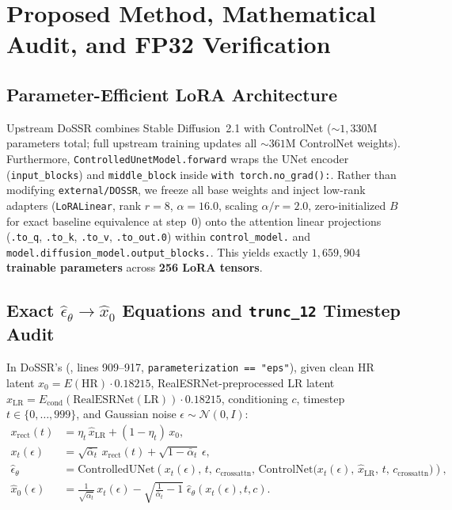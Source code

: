 \documentclass[11pt]{article}
\begin{document}
\section{Proposed Method, Mathematical Audit, and FP32 Verification}
\subsection{Parameter-Efficient LoRA Architecture}
Upstream DoSSR combines Stable Diffusion~2.1 with ControlNet ($\sim 1{,}330\text{M}$ parameters total; full upstream training updates all $\sim 361\text{M}$ ControlNet weights). Furthermore, \texttt{ControlledUnetModel.forward} wraps the UNet encoder (\texttt{input\_blocks}) and \texttt{middle\_block} inside \texttt{with torch.no\_grad():}. Rather than modifying \texttt{external/DOSSR}, we freeze all base weights and inject low-rank adapters (\texttt{LoRALinear}, rank $r=8$, $\alpha=16.0$, scaling $\alpha/r = 2.0$, zero-initialized $B$ for exact baseline equivalence at step~0) onto the attention linear projections (\texttt{.to\_q}, \texttt{.to\_k}, \texttt{.to\_v}, \texttt{.to\_out.0}) within \texttt{control\_model.} and \texttt{model.diffusion\_model.output\_blocks.}. This yields exactly \textbf{$1{,}659{,}904$ trainable parameters} across \textbf{256 LoRA tensors}.

\subsection{Exact \texorpdfstring{$\hat{\epsilon}_\theta \to \hat{x}_0$}{epsilon to x0} Equations and \texttt{trunc\_12} Timestep Audit}
In DoSSR's  (, lines 909--917, \texttt{parameterization == "eps"}), given clean HR latent $x_0 = E(\text{HR})\cdot 0.18215$, RealESRNet-preprocessed LR latent $\hat{x}_{\text{LR}} = E_{\text{cond}}(\text{RealESRNet}(\text{LR}))\cdot 0.18215$, conditioning $c$, timestep $t \in \{0,\dots,999\}$, and Gaussian noise $\epsilon \sim \mathcal{N}(0, I)$:
\begin{align}
x_{\text{rect}}(t) &= \eta_t\,\hat{x}_{\text{LR}} + (1 - \eta_t)\,x_0, \label{eq:xrect} \\
x_t(\epsilon) &= \sqrt{\bar{\alpha}_t}\,x_{\text{rect}}(t) + \sqrt{1 - \bar{\alpha}_t}\,\epsilon, \label{eq:qsample} \\
\hat{\epsilon}_\theta &= \text{ControlledUNet}\!\left(x_t(\epsilon),\, t,\, c_{\text{crossattn}},\, \text{ControlNet}\big(x_t(\epsilon),\, \hat{x}_{\text{LR}},\, t,\, c_{\text{crossattn}}\big)\right), \label{eq:epshat} \\
\hat{x}_0(\epsilon) &= \frac{1}{\sqrt{\bar{\alpha}_t}}\,x_t(\epsilon) - \sqrt{\frac{1}{\bar{\alpha}_t} - 1}\;\hat{\epsilon}_\theta(x_t(\epsilon), t, c). \label{eq:x0hat}
\end{align}
\end{document}

